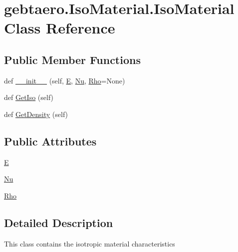 \hypertarget{classgebtaero_1_1_iso_material_1_1_iso_material}{}\section{gebtaero.\+Iso\+Material.\+Iso\+Material Class Reference}
\label{classgebtaero_1_1_iso_material_1_1_iso_material}
\subsection*{Public Member Functions}
\begin{DoxyCompactItemize}
\item 
def \hyperlink{classgebtaero_1_1_iso_material_1_1_iso_material_ae9bef5bb23ffa56bd8342ecb0bf11ced}{\+\_\+\+\_\+init\+\_\+\+\_\+} (self, \hyperlink{classgebtaero_1_1_iso_material_1_1_iso_material_a95ef904760eb41f521d8a921fc44e5ba}{E}, \hyperlink{classgebtaero_1_1_iso_material_1_1_iso_material_a1a590e5600152a083c4ee3d0fb12451a}{Nu}, \hyperlink{classgebtaero_1_1_iso_material_1_1_iso_material_ace8e4cdd649efe5f36fd0093afa6b93a}{Rho}=None)
\item 
def \hyperlink{classgebtaero_1_1_iso_material_1_1_iso_material_aa8457a623f8f6f0e390acecea84b7ae4}{Get\+Iso} (self)
\item 
def \hyperlink{classgebtaero_1_1_iso_material_1_1_iso_material_a8efa18b7c42252bca0f1232916545920}{Get\+Density} (self)
\end{DoxyCompactItemize}
\subsection*{Public Attributes}
\begin{DoxyCompactItemize}
\item 
\hyperlink{classgebtaero_1_1_iso_material_1_1_iso_material_a95ef904760eb41f521d8a921fc44e5ba}{E}
\item 
\hyperlink{classgebtaero_1_1_iso_material_1_1_iso_material_a1a590e5600152a083c4ee3d0fb12451a}{Nu}
\item 
\hyperlink{classgebtaero_1_1_iso_material_1_1_iso_material_ace8e4cdd649efe5f36fd0093afa6b93a}{Rho}
\end{DoxyCompactItemize}


\subsection{Detailed Description}
\begin{DoxyVerb}This class contains the isotropic material characteristics
\end{DoxyVerb}
 

